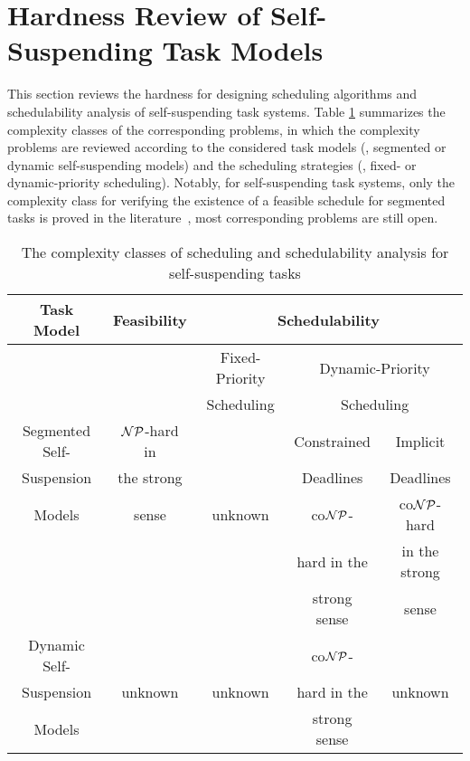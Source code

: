 \section{Hardness Review of Self-Suspending Task Models}
\label{sec:hardness}
This section reviews the hardness for designing scheduling algorithms and schedulability analysis of self-suspending task systems. Table \ref{table:complexity} summarizes the complexity classes of the corresponding problems, in which the complexity problems are reviewed according to the considered task models (\ie, segmented or dynamic self-suspending models) and the scheduling strategies (\ie, fixed- or dynamic-priority scheduling). Notably, for self-suspending task systems, only the complexity class for verifying the existence of a feasible schedule for segmented tasks is proved in the literature~\cite{Ric03,Ridouard_2004}, most corresponding problems are still open.

\begin{table}
\centering
    \begin{tabular}{|c|c|c|c|c|}
 \hline
        Task Model & Feasibility & \multicolumn{3}{c|}{Schedulability} \\
        \hline
        &  & Fixed-Priority & \multicolumn{2}{c|}{Dynamic-Priority}\\
        &  & Scheduling     & \multicolumn{2}{c|}{Scheduling}\\
        \cline{3-5}    
        Segmented Self- & ${\cal NP}$-hard in &  & Constrained & Implicit\\
        Suspension  & the strong &   & Deadlines   & Deadlines \\
        \cline{4-5}
        Models & sense \cite{Ridouard_2004} & unknown & co${\cal NP}$- & co${\cal NP}$-hard \\
        &  & & hard in the & in the strong\\
        & & & strong sense & sense\\
        \hline
        Dynamic Self- & \multirow{3}{*}{unknown} & & co${\cal NP}$- & \multirow{3}{*}{unknown}\\
        Suspension & & unknown &hard in the & \\
        Models & & & strong sense & \\
        \hline
    \end{tabular}
    \caption{The complexity classes of scheduling and schedulability analysis for self-suspending tasks}
    \label{table:complexity}
\end{table}

